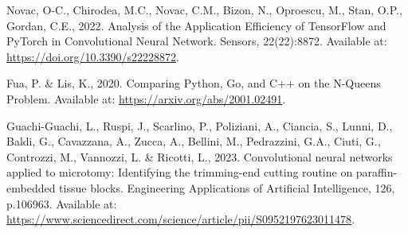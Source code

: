 \begin{thebibliography}{99}
    Novac, O-C., Chirodea, M.C., Novac, C.M., Bizon, N., Oproescu, M., Stan, O.P., Gordan, C.E., 2022. Analysis of the Application Efficiency of TensorFlow and PyTorch in Convolutional Neural Network. Sensors, 22(22):8872. Available at: \url{https://doi.org/10.3390/s22228872}.

    Fua, P. \& Lis, K., 2020. Comparing Python, Go, and C++ on the N-Queens Problem. Available at: \url{https://arxiv.org/abs/2001.02491}.

    Guachi-Guachi, L., Ruspi, J., Scarlino, P., Poliziani, A., Ciancia, S., Lunni, D., Baldi, G., Cavazzana, A., Zucca, A., Bellini, M., Pedrazzini, G.A., Ciuti, G., Controzzi, M., Vannozzi, L. \& Ricotti, L., 2023. Convolutional neural networks applied to microtomy: Identifying the trimming-end cutting routine on paraffin-embedded tissue blocks. Engineering Applications of Artificial Intelligence, 126, p.106963. Available at: \url{https://www.sciencedirect.com/science/article/pii/S0952197623011478}.
    
\end{thebibliography}